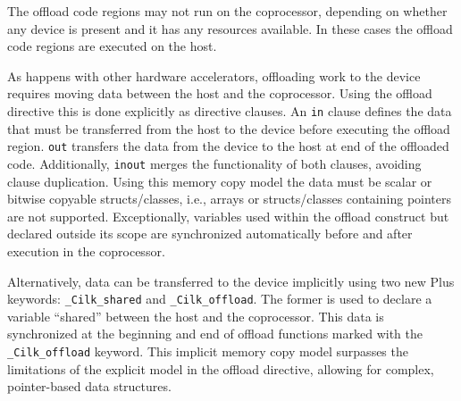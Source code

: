 \documentclass[../thesis]{subfiles}
\begin{document}
	The offload code regions may not run on the coprocessor, depending on whether any device is present and it has any resources available. In these cases the offload code regions are executed on the host.

	As happens with other hardware accelerators, offloading work to the device requires moving data between the host and the coprocessor. Using the offload directive this is done explicitly as directive clauses. An \texttt{in} clause defines the data that must be transferred from the host to the device before executing the offload region. \texttt{out} transfers the data from the device to the host at end of the offloaded code. Additionally, \texttt{inout} merges the functionality of both clauses, avoiding clause duplication. Using this memory copy model the data must be scalar or bitwise copyable structs/classes, i.e., arrays or structs/classes containing pointers are not supported. Exceptionally, variables used within the offload construct but declared outside its scope are synchronized automatically before and after execution in the coprocessor.

	Alternatively, data can be transferred to the device implicitly using two new \intel\cilk Plus keywords: \texttt{\_Cilk\_shared} and \texttt{\_Cilk\_offload}. The former is used to declare a variable ``shared'' between the host and the coprocessor. This data is synchronized at the beginning and end of offload functions marked with the \texttt{\_Cilk\_offload} keyword. This implicit memory copy model surpasses the limitations of the explicit model in the offload directive, allowing for complex, pointer-based data structures.
\end{document}
